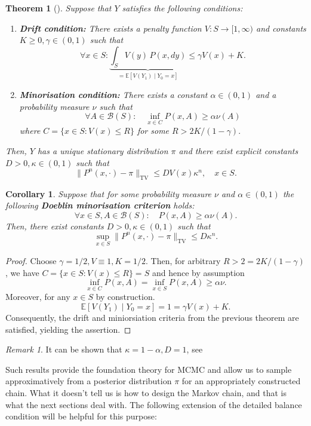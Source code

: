 \documentclass[
]{book}
\newtheorem{theorem}{Theorem}[chapter]
\newtheorem{corollary}{Corollary}[chapter]
\theoremstyle{definition}
\theoremstyle{definition}
\theoremstyle{definition}
\theoremstyle{definition}
\theoremstyle{remark}
\newtheorem*{remark}{Remark}
\begin{document}
\begin{theorem}[\cite{hairer11}]
Suppose that \(Y\) satisfies the following conditions: 
\begin{enumerate} 
\item \textbf{Drift condition:} There exists a \textit{penalty function} \(V\colon S \to [1,\infty)\) and constants \(K \geq 0, \gamma \in (0,1)\) such that 
\[\forall x \in S: \underbrace{\int_S V(y)\, P(x,dy)}_{= \mathbb{E}[V(Y_1) \mid Y_0 = x]}  \leq \gamma V(x) + K. \]
\item \textbf{Minorisation condition:} There exists a constant \(\alpha \in (0,1)\) and a probability measure \(\nu\) such that 
\[\forall A \in \mathcal{B}(S): \quad \inf_{x \in C} P(x,A) \geq \alpha \nu(A)\]
where  \(C = \{x \in S: V(x) \leq R\}\) for some \(R > 2K/(1-\gamma).\)
\end{enumerate}
Then, \(Y\) has a unique stationary distribution \(\pi\) and there exist explicit constants \(D > 0, \kappa \in (0,1)\) such that 
\[\lVert P^n(x,\cdot) - \pi \rVert_{\mathrm{TV}} \leq DV(x) \kappa^n, \quad x \in S.\]
\end{theorem}

\begin{corollary} 
Suppose that for some probability measure \(\nu\) and \(\alpha \in (0,1)\) the following \textbf{Doeblin minorisation criterion} holds: 
\[\forall x \in S, A \in \mathcal{B}(S): \quad P(x,A) \geq \alpha \nu(A). \]
Then, there exist constants \(D > 0,\kappa \in (0,1)\) such that
\[\sup_{x \in S} \lVert P^n(x,\cdot) - \pi \rVert_{\mathrm{TV}} \leq D\kappa^n.\]
\end{corollary}
\begin{proof} 
Choose \(\gamma = 1/2, V \equiv 1, K = 1/2\). Then, for arbitrary \(R > 2 = 2K/(1-\gamma)\), we have \(C = \{x \in S: V(x) \leq R\} = S\) and hence by assumption 
\[\inf_{x \in C} P(x,A) = \inf_{x \in S} P(x,A)  \geq \alpha \nu.\]
Moreover, for any \(x \in S\) by construction.
\[\mathbb{E}[V(Y_1) \mid Y_0 = x] = 1 = \gamma V(x) +K.\]	
Consequently, the drift and miniorsiation criteria from the previous theorem are satisfied, yielding the assertion.
\end{proof}
\begin{remark} 
It can be shown that \(\kappa = 1 - \alpha, D=1\), see \cite[Theorem 16.0.2]{meyntweedie}
\end{remark}

Such results provide the foundation theory for MCMC and allow us to sample approximatively from a posterior distribution \(\pi\) for an appropriately constructed chain. What it doesn't tell us is how to design the Markov chain, and that is what the next sections deal with. The following extension of the detailed balance condition will be helpful for this purpose:
\end{document}
